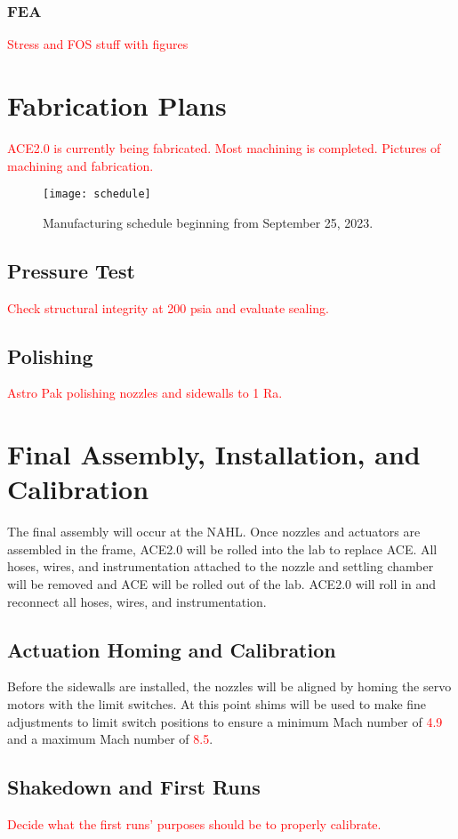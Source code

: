 \subsubsection{FEA}

\textcolor{red}{Stress and FOS stuff with figures}

\section{Fabrication Plans}

\textcolor{red}{ACE2.0 is currently being fabricated. Most machining is completed. Pictures of machining and fabrication.}

\begin{figure}[ht!]
    \centering
    \texttt{[image: schedule]}
    \caption{Manufacturing schedule beginning from September 25, 2023.}
    \label{fig:schedule}
\end{figure}

\subsection{Pressure Test}

\textcolor{red}{Check structural integrity at 200 psia and evaluate sealing.}

\subsection{Polishing}

\textcolor{red}{Astro Pak polishing nozzles and sidewalls to 1 Ra.}

\section{Final Assembly, Installation, and Calibration}

The final assembly will occur at the NAHL. Once nozzles and actuators are assembled in the frame, ACE2.0 will be rolled into the lab to replace ACE. All hoses, wires, and instrumentation attached to the nozzle and settling chamber will be removed and ACE will be rolled out of the lab. ACE2.0 will roll in and reconnect all hoses, wires, and instrumentation.

\subsection{Actuation Homing and Calibration}

Before the sidewalls are installed, the nozzles will be aligned by homing the servo motors with the limit switches. At this point shims will be used to make fine adjustments to limit switch positions to ensure a minimum Mach number of \textcolor{red}{4.9} and a maximum Mach number of \textcolor{red}{8.5}.

\subsection{Shakedown and First Runs}

\textcolor{red}{Decide what the first runs' purposes should be to properly calibrate.}

